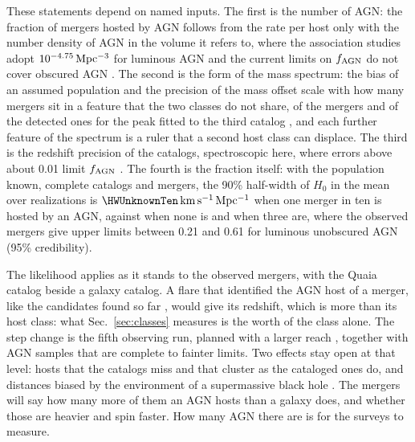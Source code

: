 \documentclass[aps,prd,reprint,twocolumn,superscriptaddress,nofootinbib,floatfix,nolongbibliography]{revtex4-2}
\newcommand{\kms}{{\rm km\,s^{-1}\,Mpc^{-1}}}
\newcommand{\fagn}{f_{\rm AGN}}
\begin{document}
These statements depend on named inputs. The first is the number of AGN:
the fraction of mergers hosted by AGN follows from the rate per host only
with the number density of AGN in the volume it refers to, where the
association
studies adopt $10^{-4.75}\,{\rm Mpc^{-3}}$ for luminous AGN
\cite{Veronesi:2022hql,Bom:2023zgw} and the current limits on $\fagn$ do not
cover obscured AGN \cite{Pouw:2026lar}. The second is the form of the mass
spectrum: the bias of an assumed population and the precision of the mass
offset scale with how many mergers sit in a feature that the two classes do
not share, \ObsPeakFrac{} of the mergers and \ObsHDDetPeakShare{} of the
detected ones for the peak fitted to the third catalog
\cite{KAGRA:2021duu}, and each further feature of the spectrum is a ruler
that a second host class can displace. %
The third is the redshift precision of the catalogs,
spectroscopic here, where errors above about 0.01 limit $\fagn$
\cite{Pouw:2026lar}. The fourth is the fraction itself: with the population
known, complete catalogs and \MockNev{} mergers, the 90\% half-width of
$H_0$ in the mean over realizations is $\HWUnknownTen\,\kms$ when one merger
in ten is hosted by an AGN, against \HWUnknownZero{} when none is and
\HWUnknownThirty{} when three are, where the observed mergers give
upper limits between 0.21 and 0.61 for luminous unobscured AGN
\cite{Veronesi:2024tef,Pouw:2026lar} (95\% credibility).

The likelihood applies as it stands to the observed mergers, with the Quaia
catalog \cite{Storey-Fisher:2023gca} beside a galaxy catalog. A flare that
identified the AGN host of a merger, like the candidates found so far
\cite{Graham:2020gwr,Graham:2022xxu}, would give its redshift, which is
more than its host class: what Sec.~\ref{sec:classes} measures is the worth
of the class alone. The step
change is the fifth observing run, planned with a larger reach
\cite{KAGRA:2013rdx}, together with AGN samples that are complete to fainter
limits.
Two effects stay open at that level: hosts that the catalogs miss and that
cluster as the cataloged ones do, and distances biased by the environment of
a supermassive black hole \cite{Li:2025eig}. The mergers will say how many
more of them an AGN hosts than a galaxy does, and whether those are heavier
and spin faster. %
How many AGN there are is for the surveys to measure.
\end{document}
